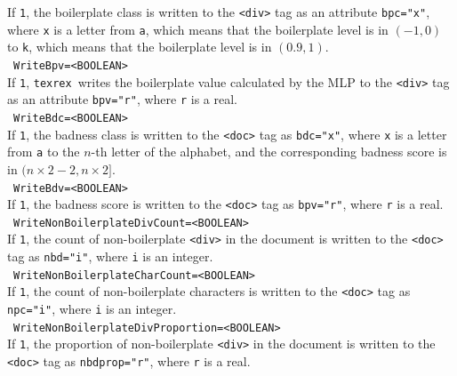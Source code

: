 \documentclass[12pt,a4paper]{article}
\newcommand{\trthis}{\texttt{texrex}}
\begin{document}
If \texttt{1}, the boilerplate class is written to the \texttt{<div>} tag as an attribute \texttt{bpc="x"}, where \texttt{x} is a letter from \texttt{a}, which means that the boilerplate level is in $(-1,0)$ to \texttt{k}, which means that the boilerplate level is in $(0.9,1)$.\\

\noindent\textbullet~\texttt{WriteBpv=<BOOLEAN>}\\

If \texttt{1}, \trthis\ writes the boilerplate value calculated by the MLP to the \texttt{<div>} tag as an attribute \texttt{bpv="r"}, where \texttt{r} is a real.\\ 

\noindent\textbullet~\texttt{WriteBdc=<BOOLEAN>}\\

If \texttt{1}, the badness class is written to the \texttt{<doc>} tag as \texttt{bdc="x"}, where \texttt{x} is a letter from \texttt{a} to the $n$-th letter of the alphabet, and the corresponding badness score is in $(n\times2-2,n\times2]$.\\

\noindent\textbullet~\texttt{WriteBdv=<BOOLEAN>}\\

If \texttt{1}, the badness score is written to the \texttt{<doc>} tag as \texttt{bpv="r"}, where \texttt{r} is a real.\\ 

\noindent\textbullet~\texttt{WriteNonBoilerplateDivCount=<BOOLEAN>}\\

If \texttt{1}, the count of non-boilerplate \texttt{<div>} in the document is written to the \texttt{<doc>} tag as \texttt{nbd="i"}, where \texttt{i} is an integer.\\

\noindent\textbullet~\texttt{WriteNonBoilerplateCharCount=<BOOLEAN>}\\

If \texttt{1}, the count of non-boilerplate characters is written to the \texttt{<doc>} tag as \texttt{npc="i"}, where \texttt{i} is an integer.\\

\noindent\textbullet~\texttt{WriteNonBoilerplateDivProportion=<BOOLEAN>}\\

If \texttt{1}, the proportion of non-boilerplate \texttt{<div>} in the document is written to the \texttt{<doc>} tag as \texttt{nbdprop="r"}, where \texttt{r} is a real.\\
\end{document}
